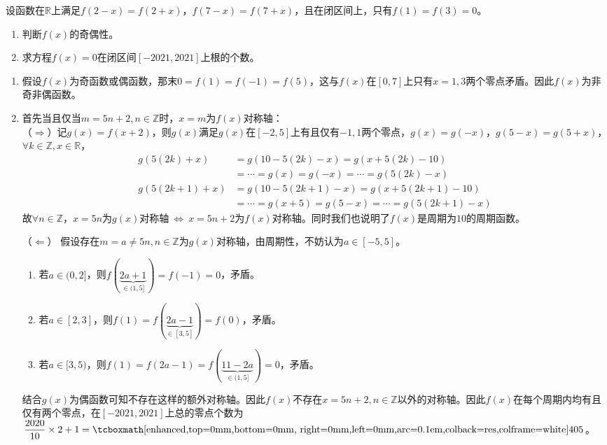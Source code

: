 \begin{que}
	设函数在$\mathbb{R}$上满足$f(2-x)=f(2+x)$，$f(7-x)=f(7+x)$，且在闭区间上，只有$f(1)=f(3)=0$。
	\begin{enumerate}
		\item 判断$f(x)$的奇偶性。
		\item 求方程$f(x)=0$在闭区间$[-2021,2021]$上根的个数。
	\end{enumerate}
\end{que}
\sol \begin{enumerate}
	\item 假设$f(x)$为奇函数或偶函数，那末$0=f(1)=f(-1)=f(5)$，这与$f(x)$在$[0,7]$上只有$x=1,3$两个零点矛盾。因此$f(x)$为非奇非偶函数。
	\item 首先当且仅当$m=5n+2,n\in\mathbb{Z}$时，$x=m$为$f(x)$对称轴：\\（$\Rightarrow$）记$g(x)=f(x+2)$，则$g(x)$满足$g(x)$在$[-2,5]$上有且仅有$-1,1$两个零点，$g(x)=g(-x)$，$g(5-x)=g(5+x)$，$\forall k\in\mathbb{Z},x\in\mathbb{R}$，
	$$\begin{aligned}g(5(2k)+x)&=g(10-5(2k)-x)=g(x+5(2k)-10)\\&=\cdots=g(x)=g(-x)=\cdots=g(5(2k)-x)\\
		g(5(2k+1)+x)&=g(10-5(2k+1)-x)=g(x+5(2k+1)-10)\\&=\cdots=g(x+5)=g(5-x)=\cdots=g(5(2k+1)-x)\end{aligned}$$故$\forall n\in\mathbb{Z}$，$x=5n$为$g(x)$对称轴$\ \Leftrightarrow\ x=5n+2$为$f(x)$对称轴。同时我们也说明了$f(x)$是周期为$10$的周期函数。\par
	（$\Leftarrow$） 假设存在$m=a\neq 5n,n\in\mathbb{Z}$为$g(x)$对称轴，由周期性，不妨认为$a\in[-5,5]$。\begin{enumerate}
		\item 若$a\in(0,2]$，则$f(\underbrace{2a+1}_{\in(1,5]})=f(-1)=0$，矛盾。
		\item 若$a\in[2,3]$，则$f(1)=f(\underbrace{2a-1}_{\in[3,5]})=f(0)$，矛盾。
		\item 若$a\in[3,5)$，则$f(1)=f(2a-1)=f(\underbrace{11-2a}_{\in(1,5]})=0$，矛盾。
	\end{enumerate}
	结合$g(x)$为偶函数可知不存在这样的额外对称轴。因此$f(x)$不存在$x=5n+2,n\in\mathbb{Z}$以外的对称轴。因此$f(x)$在每个周期内均有且仅有两个零点，在$[-2021,2021]$上总的零点个数为$\dfrac{2020}{10}\times 2+1=\res{405}$。
\end{enumerate}\par\hfill{}\easy

